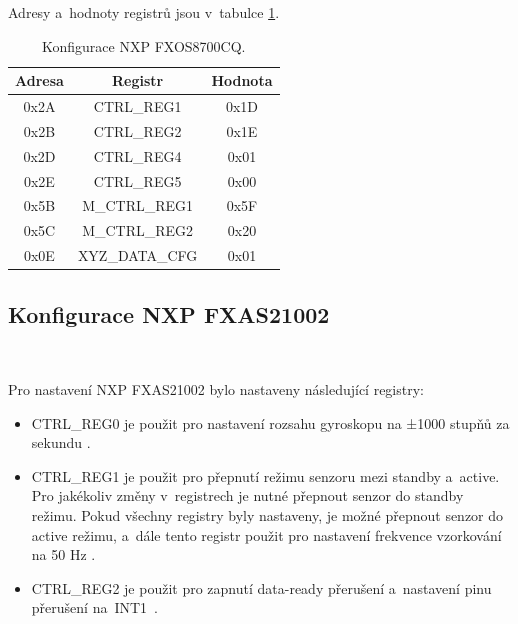 Adresy a~hodnoty registrů jsou v~tabulce \ref{tab:FXOS8700CQ}.

\begin{table}[!h]
    \centering
	\begin{tabular}{ccc}
        \hline
        \textbf{Adresa} & \textbf{Registr} & \textbf{Hodnota} \\
        \hline
        0x2A            & CTRL\_REG1       & 0x1D             \\
        0x2B            & CTRL\_REG2       & 0x1E             \\
        0x2D            & CTRL\_REG4       & 0x01             \\
        0x2E            & CTRL\_REG5       & 0x00             \\
        0x5B            & M\_CTRL\_REG1    & 0x5F             \\
        0x5C            & M\_CTRL\_REG2    & 0x20             \\
        0x0E            & XYZ\_DATA\_CFG   & 0x01             \\
        \hline
    \end{tabular}
    \caption{Konfigurace NXP FXOS8700CQ.}
    \label{tab:FXOS8700CQ}
\end{table}

\subsection{Konfigurace NXP FXAS21002}\

Pro nastavení NXP FXAS21002 bylo nastaveny následující registry: 

\begin{itemize}
    \item CTRL\_REG0 je použit pro nastavení rozsahu gyroskopu na ±1000 stupňů za
    sekundu \cite{FXAS21002}.

    \item CTRL\_REG1 je použit pro přepnutí režimu senzoru mezi standby a~active.
    Pro jakékoliv změny v~registrech je nutné přepnout senzor do standby režimu.
    Pokud všechny registry byly nastaveny, je možné přepnout senzor do active
    režimu, a~dále tento registr použit pro nastavení frekvence vzorkování na 50
    Hz \cite{FXAS21002}.

    \item CTRL\_REG2 je použit pro zapnutí data-ready přerušení a~nastavení pinu
    přerušení na~INT1~\cite{FXAS21002}.
\end{itemize}

